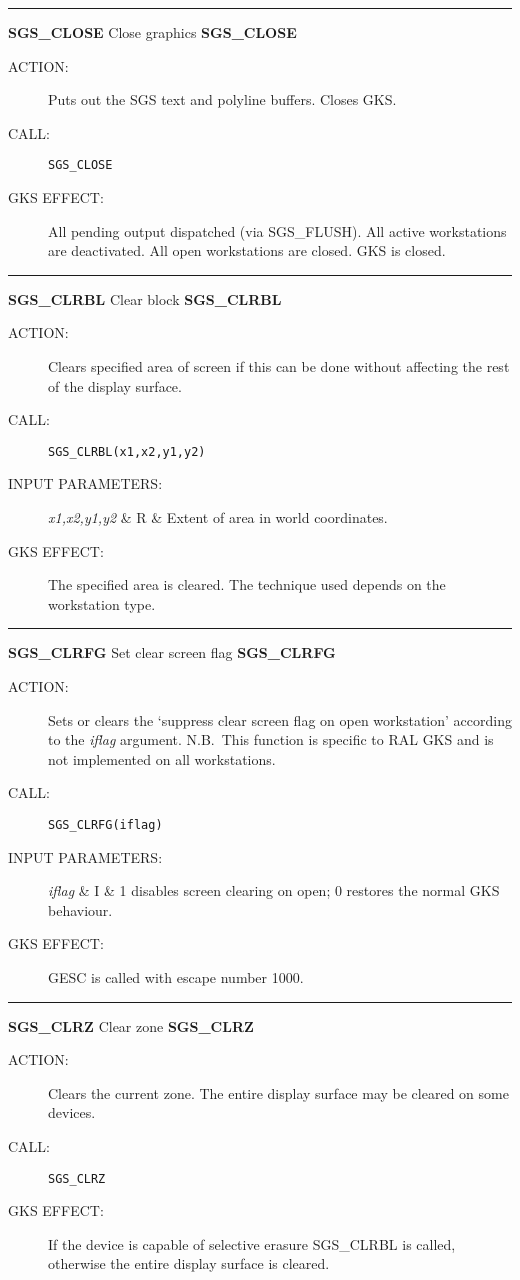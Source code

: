 \rule{\textwidth}{0.3mm}
{\Large {\bf SGS\_CLOSE} \hfill Close graphics \hfill {\bf SGS\_CLOSE}}
\begin{description}
\item [ACTION:]
Puts out the SGS text and polyline buffers.
Closes GKS.
\item [CALL:]
{\tt SGS\_CLOSE}
\item [GKS EFFECT:]
All pending output dispatched (via SGS\_FLUSH).
All active workstations are deactivated.
All open workstations are closed.
GKS is closed.
\end{description}
\goodbreak

\rule{\textwidth}{0.3mm}
{\Large {\bf SGS\_CLRBL} \hfill Clear block \hfill {\bf SGS\_CLRBL}}
\begin{description}
\item [ACTION:]
Clears specified area of screen if this can be done without affecting the rest
of the display surface.
\item [CALL:]
{\tt SGS\_CLRBL(x1,x2,y1,y2)}
\item [INPUT PARAMETERS:]
\begin{params}
{\em x1,x2,y1,y2}  & R  & Extent of area in world coordinates.
\end{params}
\item [GKS EFFECT:]
The specified area is cleared.
The technique used depends on the workstation type.
\end{description}
\goodbreak

\rule{\textwidth}{0.3mm}
{\Large {\bf SGS\_CLRFG} \hfill Set clear screen flag \hfill {\bf SGS\_CLRFG}}
\begin{description}
\item [ACTION:]
Sets or clears the `suppress clear screen flag on open workstation' according
to the {\em iflag} argument.
N.B.\ This function is specific to RAL GKS and is not implemented on all
workstations.
\item [CALL:]
{\tt SGS\_CLRFG(iflag)}
\item [INPUT PARAMETERS:]
\begin{params}
{\em iflag}  & I  & 1 disables screen clearing on open; 0 restores the normal
GKS behaviour.
\end{params}
\item [GKS EFFECT:]
GESC is called with escape number 1000.
\end{description}
\goodbreak

\rule{\textwidth}{0.3mm}
{\Large {\bf SGS\_CLRZ} \hfill Clear zone \hfill {\bf SGS\_CLRZ}}
\begin{description}
\item [ACTION:]
Clears the current zone.
The entire display surface may be cleared on some devices.
\item [CALL:]
{\tt SGS\_CLRZ}
\item [GKS EFFECT:]
If the device is capable of selective erasure SGS\_CLRBL is called, otherwise
the entire display surface is cleared.
\end{description}
\goodbreak

